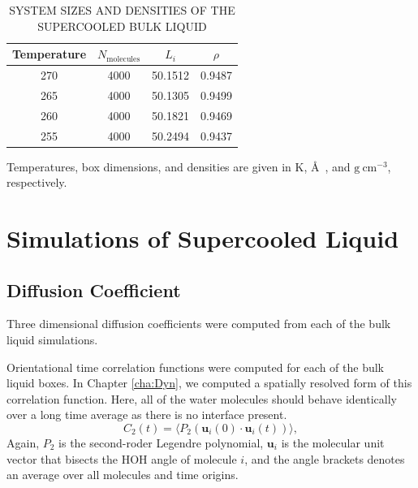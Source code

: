 \begin{table}[h] \centering \caption{SYSTEM SIZES AND DENSITIES OF THE SUPERCOOLED BULK LIQUID\label{tab:qll-liquid}}
\begin{tabular}{cccc}
\hline
\hline
 Temperature & $N_\mathrm{molecules}$ & $L_i$ & $\rho$\\
\hline
270 & 4000 & 50.1512 & 0.9487 \\
265 & 4000 & 50.1305 & 0.9499 \\
260 & 4000 & 50.1821 & 0.9469 \\
255 & 4000 & 50.2494 & 0.9437 \\
\hline
\hline
\end{tabular}
\begin{flushleft}
Temperatures, box dimensions, and densities are given in K, \AA~, and
$\mathrm{g}~\mathrm{cm}^{-3}$, respectively.
\end{flushleft}
\end{table}

\section{Simulations of Supercooled Liquid}

\subsection{Diffusion Coefficient}
Three dimensional diffusion coefficients were computed from each of the
bulk liquid simulations. 

Orientational time correlation functions were computed for each of the
bulk liquid boxes. In Chapter \ref{cha:Dyn}, we computed a spatially
resolved form of this correlation function. Here, all of the water
molecules should behave identically over a long time average as there
is no interface present. 
\begin{equation}\label{C(t)}
  C_{2}(t)=\langle P_{2}(\mathbf{u}_i(0)\cdot \mathbf{u}_i(t))\rangle,
\end{equation}
Again, $P_2$ is the second-roder Legendre polynomial, 
$\mathbf{u}_i$ is the molecular unit vector that bisects the HOH angle
of molecule $i$, and the angle brackets denotes an average over all
molecules and time origins. 

